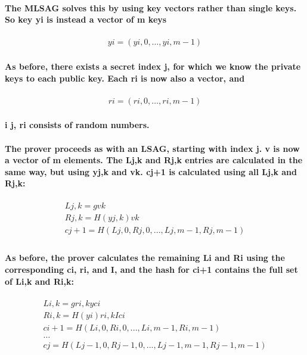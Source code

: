 \documentclass{article}
\begin{document}
\paragraph{The MLSAG solves this by using key vectors rather than single keys.  So key yi is instead a vector of m keys}

\begin{eqnarray}
  yi = (yi,0, …, yi,m-1)
\end{eqnarray}

\paragraph{As before, there exists a secret index j, for which we know the private keys to each public key.  Each ri is now also a vector, and}

\begin{eqnarray}
  ri = (ri,0, …, ri,m-1)
\end{eqnarray}

\paragraph{i j, ri consists of random numbers.}

\paragraph{The prover proceeds as with an LSAG, starting with index j.  v is now a vector of m elements.  The Lj,k and Rj,k entries are calculated in the same way, but using yj,k and vk.  cj+1 is calculated using all Lj,k and Rj,k:}

\begin{eqnarray}
  Lj,k=gvk\\
  Rj,k=H(yj,k)vk\\
  cj+1=H(Lj,0,Rj,0,... ,Lj,m-1,Rj,m-1)\\
\end{eqnarray}

\paragraph{As before, the prover calculates the remaining Li and Ri using the corresponding ci, ri, and I, and the hash for ci+1 contains the full set of Li,k and Ri,k:}

\begin{eqnarray}
  Li,k=gri,kyci\\
  Ri,k=H(yi)ri,kIci\\
  ci+1=H(Li,0,Ri,0,... ,Li,m-1,Ri,m-1) \\
  … \\
  cj=H(Lj-1,0,Rj-1,0,... ,Lj-1,m-1,Rj-1,m-1) 
\end{eqnarray}
\end{document}
